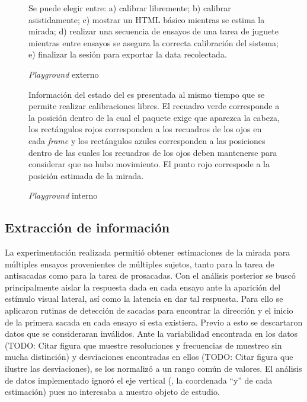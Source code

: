   \begin{figure}
    \centering

    Se puede elegir entre:
    a) calibrar libremente;
    b) calibrar asistidamente;
    c) mostrar un HTML básico mientras se estima la mirada;
    d) realizar una secuencia de ensayos de una tarea de juguete mientras
    entre ensayos se asegura la correcta calibración del sistema;
    e) finalizar la sesión para exportar la data recolectada.

    \caption{\textit{Playground} externo}
    \label{fig:external-playground}
  \end{figure}

  \begin{figure}
    \centering

    Información del estado del \eyetracker es presentada al mismo tiempo que se
    permite realizar calibraciones libres.
    El recuadro verde corresponde a la posición dentro de la cual el paquete
    \webgazer exige que aparezca la cabeza, los rectángulos rojos corresponden
    a los recuadros de los ojos en cada \textit{frame} y los rectángulos azules
    corresponden a las posiciones dentro de las cuales los recuadros de los
    ojos deben mantenerse para considerar que no hubo movimiento.
    El punto rojo correspode a la posición estimada de la mirada.

    \caption{\textit{Playground} interno}
    \label{fig:internal-playground}
  \end{figure}

\subsection{Extracción de información}

  La experimentación realizada permitió obtener estimaciones de la mirada para
  múltiples ensayos provenientes de múltiples sujetos, tanto para la tarea de
  antisacadas como para la tarea de prosacadas.
  Con el análisis posterior se buscó principalmente aislar la respuesta dada en
  cada ensayo ante la aparición del estímulo visual lateral, así como la
  latencia en dar tal respuesta.
  Para ello se aplicaron rutinas \adhoc de detección de sacadas para encontrar
  la dirección y el inicio de la primera sacada en cada ensayo si esta
  existiera.
  Previo a esto se descartaron datos que se consideraran inválidos.
  Ante la variabilidad encontrada en los datos (TODO: Citar figura que muestre
  resoluciones y frecuencias de muestreo sin mucha distinción) y desviaciones
  encontradas en ellos (TODO: Citar figura que ilustre las desviaciones), se
  los normalizó a un rango común de valores.
  El análisis de datos implementado ignoró el eje vertical (\ie, la coordenada
  ``y'' de cada estimación) pues no interesaba a nuestro objeto de estudio.

